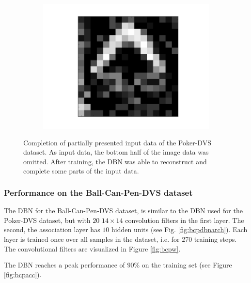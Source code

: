 \begin{figure}[h!]
\begin{subfigure}{.25\textwidth}
  		\label{fig:sub1}
	\end{subfigure}%
	\begin{subfigure}{.25\textwidth}
  		\centering
  		\includegraphics[width=.8\linewidth]{imgs/poker/compl42.png}
  		\label{fig:sub1}
	\end{subfigure}%
	\caption[Completion of partially presented input data of the Poker-DVS dataset.]{Completion of partially presented input data of the Poker-DVS dataset. As input data, the bottom half of the image data was omitted. After training, the DBN was able to reconstruct and complete some parts of the input data.}
	\label{fig:pokercompl}
\end{figure}

\clearpage

\subsubsection{Performance on the Ball-Can-Pen-DVS dataset} \label{c:pokerexp}

The DBN for the Ball-Can-Pen-DVS dataset, is similar to the DBN used for the Poker-DVS dataset, but with  $20$ $14 \times 14$ convolution filters in the first layer. The second, the association layer has $10$ hidden units (see Fig. \ref{fig:bcpdbnarch}).
Each layer is trained once over all samples in the dataset, i.e. for 270 training steps. 
The convolutional filters are visualized in Figure \ref{fig:bcpw}.

The DBN reaches a peak performance of $90 \%$ on the training set (see Figure \ref{fig:bcpacc}). 

